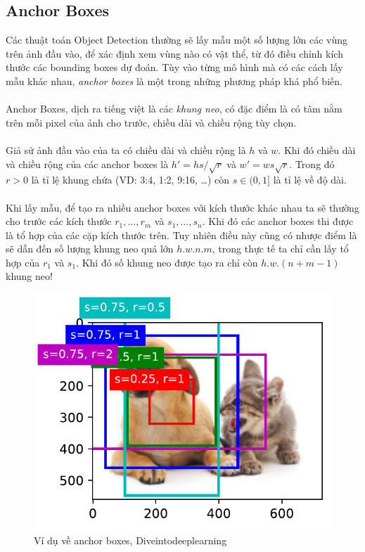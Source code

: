 \documentclass{article}
\begin{document}
\subsection{Anchor Boxes}
Các thuật toán Object Detection thường sẽ lấy mẫu một số lượng lớn các vùng trên ảnh đầu vào, để xác định xem vùng nào có vật thể, từ đó điều chỉnh kích thước các bounding boxes dự đoán. Tùy vào từng mô hình mà có các cách lấy mẫu khác nhau, \textit{anchor boxes} là một trong những phương pháp khá phổ biến. \\\\
Anchor Boxes, dịch ra tiếng việt là các \textit{khung neo}, có đặc điểm là có tâm nằm trên mỗi pixel của ảnh cho trước, chiều dài và chiều rộng tùy chọn.\\\\
Giả sử ảnh đầu vào của ta có chiều dài và chiều rộng là $h$ và $w$. Khi đó chiều dài và chiều rộng của các anchor boxes là $h' = hs/\sqrt{r}$ và $w' = ws\sqrt{r}$. Trong đó $r > 0$ là tỉ lệ khung chứa (VD: 3:4, 1:2, 9:16, \ldots) còn $s \in (0,1]$ là tỉ lệ về độ dài. \\\\Khi lấy mẫu, để tạo ra nhiều anchor boxes với kích thước khác nhau ta sẽ thường cho trước các kích thước $r_1, \ldots, r_m$ và $s_1, \ldots, s_n$. Khi đó các anchor boxes thi được là tổ hợp của các cặp kích thước trên. Tuy nhiên điều này cũng có nhược điểm là sẽ dẫn đến số lượng khung neo quá lớn $h.w.n.m$, trong thực tế ta chỉ cần lấy tổ hợp của $r_1$ và $s_1$. Khi đó số khung neo được tạo ra chỉ còn $h.w.(n+m-1)$ khung neo!
\begin{figure}[ht!]
    \centering
    \includegraphics[width = 0.5\linewidth]{output_anchor_f592d1_48_0.pdf}
    \caption{Ví dụ về anchor boxes, Diveintodeeplearning}
    \label{fig2}
\end{figure}
\end{document}
